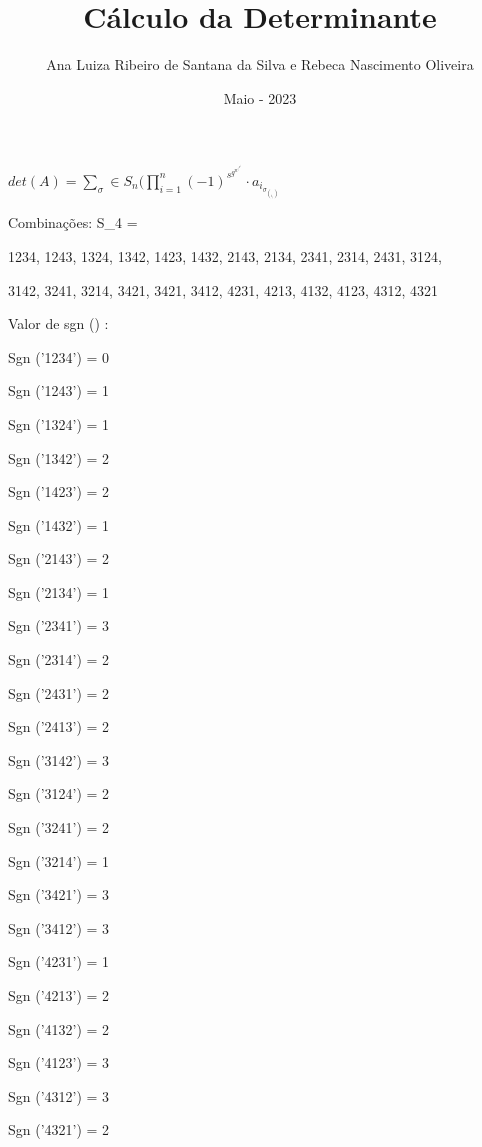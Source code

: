 \documentclass{report}
\title{\textbf{Cálculo da Determinante}}
\author{Ana Luiza Ribeiro de Santana da Silva e Rebeca Nascimento Oliveira}
\date{Maio - 2023}
\begin{document}
\maketitle

\vspace{0,5cm}

\begin{center}
$det(A) = \sum_\sigma \in S_n( \prod_{i=1}^{n} (-1)^s^g^n^( ^\sigma^) \cdot a_i_\sigma _(_i_))$
\end{center}

\vspace{1cm}

Combinações:
S_4 = { 1234, 1243, 1324, 1342, 1423, 1432, 2143, 2134, 2341, 2314, 2431, 3124, 

3142, 3241, 3214, 3421, 3421, 3412, 4231, 4213, 4132, 4123, 4312, 4321}

\vspace{1cm}

Valor de sgn (\sigma)
:

\vspace{0,2cm}

Sgn  ('1234') = 0

Sgn ('1243') = 1

Sgn ('1324') = 1

Sgn ('1342') = 2

Sgn ('1423') = 2

Sgn ('1432') =  1

Sgn ('2143') = 2

Sgn ('2134') = 1

Sgn ('2341') = 3

Sgn ('2314') = 2

Sgn ('2431') = 2

Sgn ('2413') = 2

Sgn ('3142') = 3

Sgn ('3124') = 2

Sgn ('3241') = 2

Sgn ('3214') = 1

Sgn ('3421') = 3

Sgn ('3412') = 3

Sgn ('4231') = 1

Sgn ('4213') = 2

Sgn ('4132') = 2

Sgn ('4123') = 3

Sgn ('4312') = 3

Sgn ('4321') = 2

\vspace{1cm}
\end{document}
